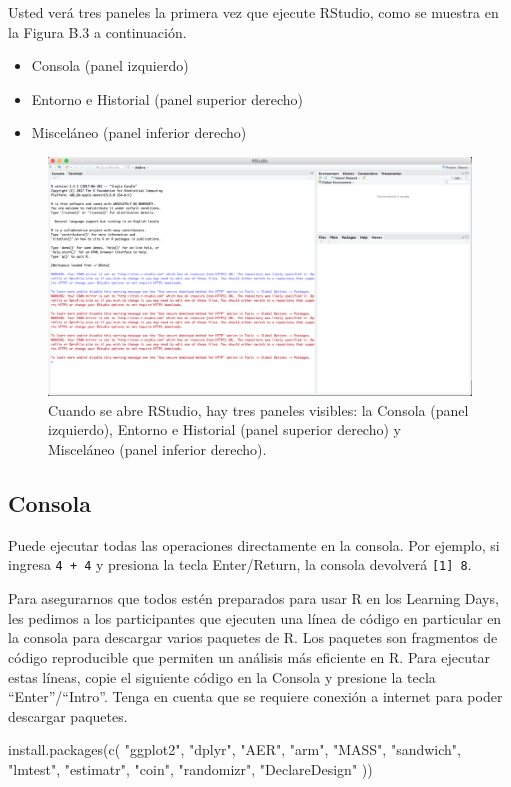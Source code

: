 \documentclass[
  12pt,
  spanish,
]{book}
\newenvironment{Shaded}{\begin{snugshade}}{\end{snugshade}}
\newcommand{\FunctionTok}[1]{\textcolor[rgb]{0.00,0.00,0.00}{#1}}
\newcommand{\NormalTok}[1]{#1}
\newcommand{\StringTok}[1]{\textcolor[rgb]{0.31,0.60,0.02}{#1}}
\providecommand{\tightlist}{%
  \setlength{\itemsep}{0pt}\setlength{\parskip}{0pt}}
\begin{document}
Usted verá tres paneles la primera vez que ejecute RStudio, como se muestra en la Figura B.3 a continuación.

\begin{itemize}
\tightlist
\item
  Consola (panel izquierdo)
\item
  Entorno e Historial (panel superior derecho)
\item
  Misceláneo (panel inferior derecho)
\end{itemize}

\begin{figure}
\includegraphics[width=0.8\linewidth]{Images/rstudio_intro} \caption{Cuando se abre RStudio, hay tres paneles visibles:  la Consola (panel izquierdo), Entorno e Historial (panel superior derecho) y  Misceláneo (panel inferior derecho).}\label{fig:rstudiointro}
\end{figure}

\hypertarget{consola}{%
\subsection{Consola}\label{consola}}

Puede ejecutar todas las operaciones directamente en la consola. Por ejemplo, si ingresa \texttt{4\ +\ 4} y presiona la tecla Enter/Return, la consola devolverá \texttt{{[}1{]}\ 8}.

Para asegurarnos que todos estén preparados para usar R en los Learning Days, les pedimos a los participantes que ejecuten una línea de código en particular en la consola para descargar varios paquetes de R. Los paquetes son fragmentos de código reproducible que permiten un análisis más eficiente en R. Para ejecutar estas líneas, copie el siguiente código en la Consola y presione la tecla ``Enter''/``Intro''. Tenga en cuenta que se requiere conexión a internet para poder descargar paquetes.

\begin{Shaded}
\begin{Highlighting}[]
\FunctionTok{install.packages}\NormalTok{(}\FunctionTok{c}\NormalTok{(}
  \StringTok{"ggplot2"}\NormalTok{, }\StringTok{"dplyr"}\NormalTok{, }\StringTok{"AER"}\NormalTok{, }\StringTok{"arm"}\NormalTok{, }\StringTok{"MASS"}\NormalTok{, }\StringTok{"sandwich"}\NormalTok{,}
  \StringTok{"lmtest"}\NormalTok{, }\StringTok{"estimatr"}\NormalTok{, }\StringTok{"coin"}\NormalTok{, }\StringTok{"randomizr"}\NormalTok{, }\StringTok{"DeclareDesign"}
\NormalTok{))}
\end{Highlighting}
\end{Shaded}
\end{document}
